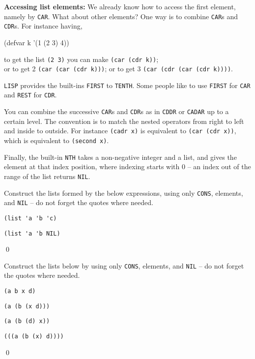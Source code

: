 \documentclass[a4paper,11pt]{article}
\begin{document}
\begin{uenum}
\item {\bf Accessing list elements:} We already know how to access the first element, namely by \Verb+CAR+. What about other elements? One way is to combine \Verb+CAR+s and \Verb+CDR+s. For instance having,

\begin{lispcode}
(defvar k '(1 (2 3) 4))
\end{lispcode}

to get the list \Verb+(2 3)+ you can make \Verb+(car (cdr k))+;\\ or to get 2 \Verb+(car (car (cdr k)))+; or to get 3 \Verb+(car (cdr (car (cdr k))))+.

\Verb+LISP+ provides the built-ins \Verb+FIRST+ to \Verb+TENTH+. Some people like to use \Verb+FIRST+ for \Verb+CAR+ and \Verb+REST+ for \Verb+CDR+.

You can combine the successive \Verb+CAR+s and \Verb+CDR+s as in \Verb+CDDR+ or \Verb+CADAR+ up to a certain level. The convention is to match the nested operators from right to left and inside to outside. For instance \Verb+(cadr x)+ is equivalent to \Verb+(car (cdr x))+, which is equivalent to \Verb+(second x)+.

Finally, the built-in \Verb+NTH+ takes a non-negative integer and a list, and gives the element at that index position, where indexing starts with 0 -- an index out of the range of the list returns \Verb+NIL+. 

\end{uenum}


\noindent\hrulefill

\begin{uexercise}

Construct the lists formed by the below expressions, using only \Verb+CONS+, elements, and \Verb+NIL+ -- do not forget the quotes where needed.

\item \Verb+(list 'a 'b 'c)+ 
\item \Verb+(list 'a 'b NIL)+ 

\qed
\end{uexercise}

\begin{uexercise}

Construct the lists below by using only \Verb+CONS+, elements, and \Verb+NIL+ -- do not forget the quotes where needed.

\item \Verb+(a b x d)+

\item \Verb+(a (b (x d)))+

\item \Verb+(a (b (d) x))+

\item \Verb+(((a (b (x) d))))+

\qed
\end{uexercise}
\end{document}
